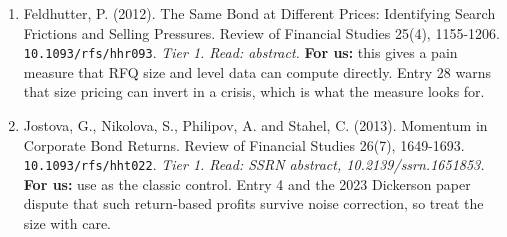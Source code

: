 \begin{enumerate}[leftmargin=*,itemsep=3pt]
\item Feldhutter, P. (2012). The Same Bond at Different Prices: Identifying Search Frictions and Selling Pressures. Review of Financial Studies 25(4), 1155-1206. \nolinkurl{10.1093/rfs/hhr093}. \emph{Tier 1. Read: abstract.} \textbf{For us:} this gives a pain measure that RFQ size and level data can compute directly. Entry 28 warns that size pricing can invert in a crisis, which is what the measure looks for.
\item Jostova, G., Nikolova, S., Philipov, A. and Stahel, C. (2013). Momentum in Corporate Bond Returns. Review of Financial Studies 26(7), 1649-1693. \nolinkurl{10.1093/rfs/hht022}. \emph{Tier 1. Read: SSRN abstract, 10.2139/ssrn.1651853.} \textbf{For us:} use as the classic control. Entry 4 and the 2023 Dickerson paper dispute that such return-based profits survive noise correction, so treat the size with care.
\end{enumerate}
